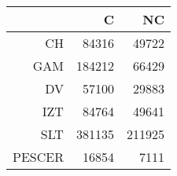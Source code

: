 \begin{table}[ht]
\centering
\begin{tabular}{rrr}
  \hline
 & C & NC \\ 
  \hline
CH & 84316 & 49722 \\ 
  GAM & 184212 & 66429 \\ 
  DV & 57100 & 29883 \\ 
  IZT & 84764 & 49641 \\ 
  SLT & 381135 & 211925 \\ 
  PESCER & 16854 & 7111 \\ 
   \hline
\end{tabular}
\end{table}
